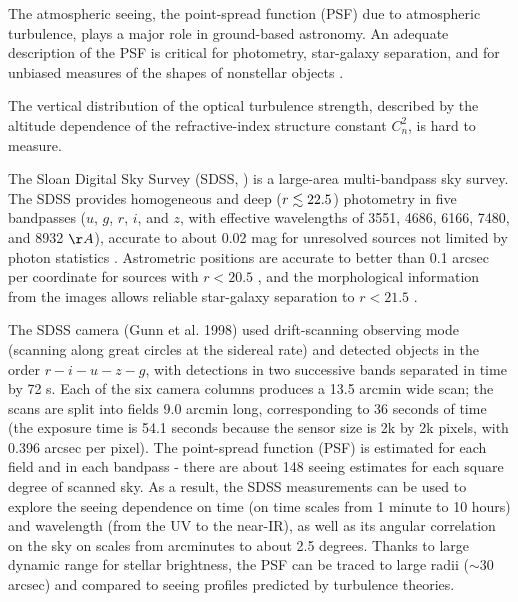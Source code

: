 

The atmospheric seeing, the point-spread function (PSF) due to atmospheric turbulence, plays
a major role in ground-based astronomy. An adequate description of the PSF is critical for 
photometry, star-galaxy separation, and for unbiased measures of the shapes of nonstellar 
objects \citep{Lupton2001}. 

The vertical distribution of the optical turbulence strength, described by the altitude 
dependence of the refractive-index structure constant $C^2_n$, is hard to measure. 


The Sloan Digital Sky Survey (SDSS, \citealt{York2000}) is a large-area multi-bandpass sky survey. 
The SDSS provides homogeneous and deep ($r\lesssim22.5$) photometry in five bandpasses ($u$, $g$, $r$, $i$, 
and $z$, with effective wavelengths of 3551, 4686, 6166, 7480, and 8932 $\AA$), 
accurate to about 0.02 mag for unresolved sources not limited by photon statistics \citep{Sesar2007}. 
Astrometric positions are accurate to better than 0.1 arcsec per coordinate for sources with $r<20.5$ 
\citep{Pier2003}, and the morphological information from the images allows reliable star-galaxy separation 
to $r<21.5$ \citep{Lupton2002}.
 
The SDSS camera (Gunn et al. 1998) used drift-scanning observing mode (scanning along great circles
at the sidereal rate) and detected objects in the order 
$r-i-u-z-g$, with detections in two successive bands separated in time by 72 s. Each of the six camera
columns produces a 13.5 arcmin wide scan; the scans are split into fields 9.0 arcmin long, corresponding
to 36 seconds of time (the exposure time is 54.1 seconds because the sensor size is 2k by 2k pixels,
with 0.396 arcsec per pixel). 
The point-spread function (PSF) is estimated for each field and in each bandpass - there are about 
148 seeing estimates for each square degree of scanned sky. As a result, the SDSS measurements can
be used to explore the seeing dependence on time (on time scales from 1 minute to 10 hours) and 
wavelength (from the UV to the near-IR), as well as its angular correlation on the sky on scales from 
arcminutes to about 2.5 degrees. Thanks to large dynamic range for stellar brightness, the PSF can 
be traced to large radii ($\sim$30 arcsec) and compared to seeing profiles predicted by turbulence
theories. 

